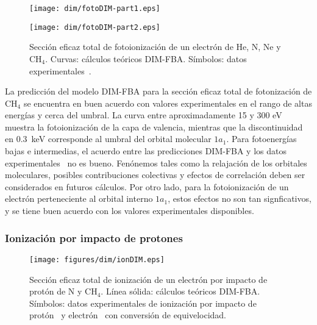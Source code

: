 \begin{figure}
\centering
\texttt{[image: dim/fotoDIM-part1.eps]} 

\vspace{-1.15cm}
\texttt{[image: dim/fotoDIM-part2.eps]}
\caption[Fotoionización de He, N, Ne y CH$_4$.]
{Sección eficaz total de fotoionización de un electrón de He, N, Ne y 
CH$_4$. Curvas: cálculos teóricos DIM-FBA. Símbolos: 
datos experimentales~\cite{Samson:90,Henke:93,Stolte:16,Samson:02,
Lukirskii:64,Henke:82,Samson:89}.}
\label{fig:photoDIM}
\end{figure}

La predicción del modelo DIM-FBA para la sección eficaz total de 
fotonización de CH$_4$ se encuentra en buen acuerdo con valores 
experimentales en el rango de altas energías y cerca del umbral. La 
curva entre aproximadamente 15 y 300 eV muestra la fotoionización de la 
capa de valencia, mientras que la discontinuidad en $0.3$~keV 
corresponde al umbral del orbital molecular $1a_1$. Para fotoenergías 
bajas e intermedias, el acuerdo entre las predicciones DIM-FBA y los 
datos experimentales~\cite{Lukirskii:64,Henke:82,Samson:89} no es bueno. 
Fenónemos tales como la relajación de los orbitales moleculares, 
posibles contribuciones colectivas y efectos de correlación deben ser  
considerados en futuros cálculos. Por otro lado, para la fotoionización 
de un electrón perteneciente al orbital interno $1a_1$, estos efectos no 
son tan signficativos, y se tiene buen acuerdo con los valores 
experimentales disponibles. 

\subsubsection{Ionización por impacto de protones}

\begin{figure}
\centering
\texttt{[image: figures/dim/ionDIM.eps]}
\caption[Ionización por impacto de protón de N y CH$_4$.]
{Sección eficaz total de ionización de un electrón por impacto de protón 
de N y CH$_4$. Línea sólida: cálculos teóricos DIM-FBA. 
Símbolos: datos experimentales de ionización por impacto de 
protón~\cite{Rudd:83,Rudd:85} y electrón~\cite{Brook:78} con conversión 
de equivelocidad.}
\label{fig:iondim}
\end{figure}

